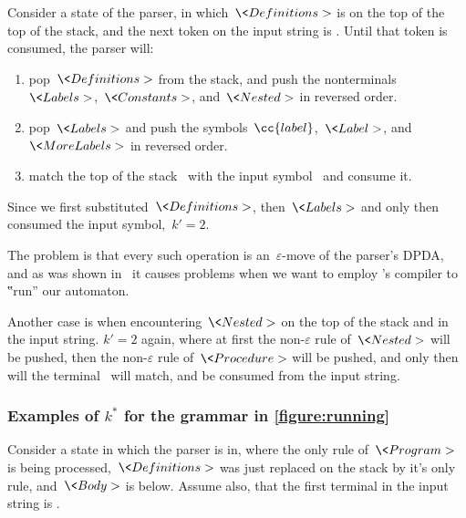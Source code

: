 Consider a state of the parser, in which~$\<Definitions>$ is on
  the top of the top of the stack, and the next token on the input string
  is .
Until that token is consumed, the parser will:
  \begin{enumerate}
    \item pop~$\<Definitions>$ from the stack, and push the
      nonterminals~$\<Labels>$,~$\<Constants>$, and~$\<Nested>$
      in reversed order.
    \item pop~$\<Labels>$ and push the symbols~$\cc{label}$,~$\<Label>$,
      and~$\<MoreLabels>$ in reversed order.
    \item match the top of the stack~ with the input
      symbol~ and consume it.
  \end{enumerate}
Since we first substituted~$\<Definitions>$, then~$\<Labels>$
  and only then consumed the input symbol,~$k'=2$.

The problem is that every such operation is an~$ε$-move of the
  parser's DPDA, and as was shown in~ it causes
  problems when we want to employ \Java's compiler to ‟run” our automaton.

Another case is when encountering~$\<Nested>$ on the top of the stack
  and  in the input string.
$k'=2$ again, where at first the non-$ε$ rule of~$\<Nested>$ will
  be pushed, then the non-$ε$ rule of~$\<Procedure>$ will be
  pushed, and only then will the terminal~ will match,
  and be consumed from the input string.

  \subsubsection{Examples of \texorpdfstring{$k^*$}{k*} for the grammar in \texorpdfstring{\cref{figure:running}}{}}
Consider a state in which the parser is in, where the
  only rule of~$\<Program>$ is being processed,~$\<Definitions>$
  was just replaced on the stack by it's only rule, and~$\<Body>$ is below.
Assume also, that the first terminal in the input string is .


